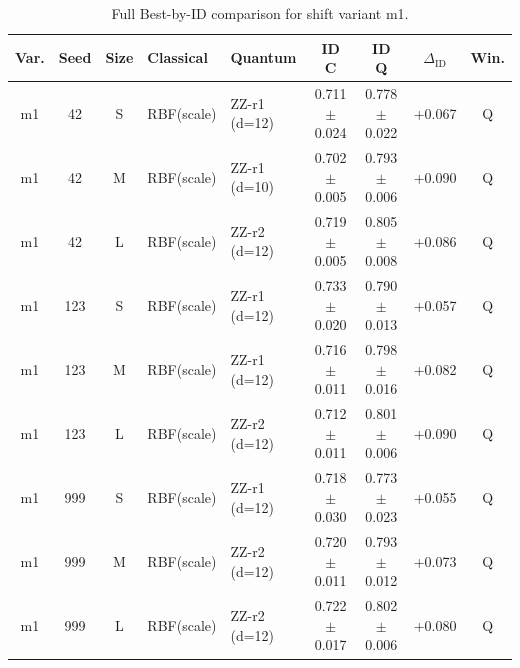\documentclass[pdflatex,sn-mathphys-num]{sn-jnl}%
\theoremstyle{thmstyleone}%
\theoremstyle{thmstyletwo}%
\theoremstyle{thmstylethree}%
\begin{document}
\begin{table}[t]
\centering
\caption{Full Best-by-ID comparison for shift variant m1.}
\label{tab:best_id_m1}
\scriptsize
\setlength{\tabcolsep}{3pt}
\begin{tabular}{@{}cccp{1.55cm}p{1.75cm}ccc c@{}}
\toprule
Var. & Seed & Size & Classical & Quantum & \shortstack{ID\\C} & \shortstack{ID\\Q} & $\Delta_{\mathrm{ID}}$ & Win. \\
\midrule
m1 & 42  & S & RBF(scale) & ZZ-r1 (d=12) & 0.711$\pm$0.024 & 0.778$\pm$0.022 & +0.067 & Q \\
m1 & 42  & M & RBF(scale) & ZZ-r1 (d=10) & 0.702$\pm$0.005 & 0.793$\pm$0.006 & +0.090 & Q \\
m1 & 42  & L & RBF(scale) & ZZ-r2 (d=12) & 0.719$\pm$0.005 & 0.805$\pm$0.008 & +0.086 & Q \\
m1 & 123 & S & RBF(scale) & ZZ-r1 (d=12) & 0.733$\pm$0.020 & 0.790$\pm$0.013 & +0.057 & Q \\
m1 & 123 & M & RBF(scale) & ZZ-r1 (d=12) & 0.716$\pm$0.011 & 0.798$\pm$0.016 & +0.082 & Q \\
m1 & 123 & L & RBF(scale) & ZZ-r2 (d=12) & 0.712$\pm$0.011 & 0.801$\pm$0.006 & +0.090 & Q \\
m1 & 999 & S & RBF(scale) & ZZ-r1 (d=12) & 0.718$\pm$0.030 & 0.773$\pm$0.023 & +0.055 & Q \\
m1 & 999 & M & RBF(scale) & ZZ-r2 (d=12) & 0.720$\pm$0.011 & 0.793$\pm$0.012 & +0.073 & Q \\
m1 & 999 & L & RBF(scale) & ZZ-r2 (d=12) & 0.722$\pm$0.017 & 0.802$\pm$0.006 & +0.080 & Q \\
\bottomrule
\end{tabular}
\end{table}
\end{document}
